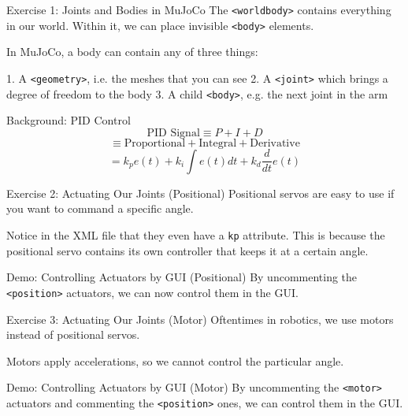 \documentclass[14pt]{beamer}
\begin{document}
	\begin{frame}{Exercise 1: Joints and Bodies in MuJoCo}
		The \texttt{<worldbody>} contains everything in our world. Within it, we can place invisible \texttt{<body>} elements.
		
		\vspace{1cm}
		
		In MuJoCo, a body can contain any of three things:
		
		\vspace{1cm}
		
		1. A \texttt{<geometry>}, i.e. the meshes that you can see
		2. A \texttt{<joint>} which brings a degree of freedom to the body
		3. A child \texttt{<body>}, e.g. the next joint in the arm
	\end{frame}
	
	\begin{frame}{Background: PID Control}
		$$\text{PID Signal} \equiv P + I + D$$
		$$\equiv\text{Proportional}+\text{Integral}+\text{Derivative}$$
		$$ = k_p e(t) + k_i \int e(t)dt + k_d \frac{d}{dt}e(t)$$
	\end{frame}
	
	\begin{frame}{Exercise 2: Actuating Our Joints (Positional)}
		Positional servos are easy to use if you want to command a specific angle.
		
		Notice in the XML file that they even have a \texttt{kp} attribute. This is because the positional servo contains its own controller that keeps it at a certain angle.
	\end{frame}
	
	\begin{frame}{Demo: Controlling Actuators by GUI (Positional)}
		By uncommenting the \texttt{<position>} actuators, we can now control them in the GUI.
	\end{frame}
	
	\begin{frame}{Exercise 3: Actuating Our Joints (Motor)}
		Oftentimes in robotics, we use motors instead of positional servos.
		
		Motors apply accelerations, so we cannot control the particular angle.
	\end{frame}
	
	\begin{frame}{Demo: Controlling Actuators by GUI (Motor)}
		By uncommenting the \texttt{<motor>} actuators and commenting the \texttt{<position>} ones, we can control them in the GUI.
	\end{frame}
	
\end{document}
